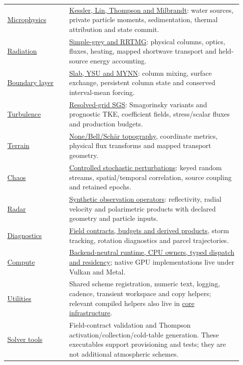 \begin{longtable}{@{}p{0.25\linewidth}p{0.70\linewidth}@{}}
\href{../include/microphysics}{Microphysics} &
\href{../src/microphysics}{Kessler, Lin, Thompson and Milbrandt}: water sources,
private particle moments, sedimentation, thermal attribution and state commit. \\
\href{../include/radiation}{Radiation} &
\href{../src/radiation}{Simple-grey and RRTMG}: physical columns, optics,
fluxes, heating, mapped shortwave transport and held-source energy accounting. \\
\href{../include/boundary_layer}{Boundary layer} &
\href{../src/boundary_layer}{Slab, YSU and MYNN}: column mixing, surface
exchange, persistent column state and conserved interval-mean forcing. \\
\href{../include/turbulence}{Turbulence} &
\href{../src/turbulence}{Resolved-grid SGS}: Smagorinsky variants and
prognostic TKE, coefficient fields, stress/scalar fluxes and production budgets. \\
\href{../include/terrain}{Terrain} &
\href{../src/terrain}{None/Bell/Sch\"ar topography}, coordinate metrics,
physical flux transforms and mapped transport geometry. \\
\href{../include/chaos}{Chaos} &
\href{../src/chaos}{Controlled stochastic perturbations}: keyed random
streams, spatial/temporal correlation, source coupling and retained epochs. \\
\href{../include/radar}{Radar} &
\href{../src/radar}{Synthetic observation operators}: reflectivity, radial
velocity and polarimetric products with declared geometry and particle inputs. \\
\href{../include/diagnostics}{Diagnostics} &
\href{../src/diagnostics}{Field contracts, budgets and derived products},
storm tracking, rotation diagnostics and parcel trajectories. \\
\href{../include/compute}{Compute} &
\href{../src/compute}{Backend-neutral runtime, CPU owners, typed dispatch
and residency}; native GPU implementations live under Vulkan and Metal. \\
\href{../include/util}{Utilities} &
Shared scheme registration, numeric text, logging, cadence, transient
workspace and copy helpers; relevant compiled helpers also live in
\href{../src/core/infra}{core infrastructure}. \\
\href{../src/tools}{Solver tools} &
Field-contract validation and Thompson activation/collection/cold-table
generation. These executables support provisioning and tests; they are not
additional atmospheric schemes. \\
\end{longtable}

